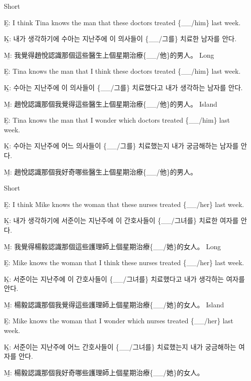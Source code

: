\pex %
\a Short\par\nobreak
\beginsubsub
\b{E:} I think Tina knows the man that these doctors treated \{\_\_/him\} last week.\par\nobreak
\b{K:} \ko 내가 생각하기에 수아는 지난주에 이 의사들이 \{\_\_/그를\} 치료한 남자를 안다. \normalfont\par\nobreak
\b{M:} \zh 我覺得趙悅認識那個這些醫生上個星期治療\{\_\_/他\}的男人。 \normalfont
\endsubsub
\a Long\par\nobreak
\beginsubsub
\b{E:} Tina knows the man that I think these doctors treated \{\_\_/him\} last week.\par\nobreak
\b{K:} \ko 수아는 지난주에 이 의사들이 \{\_\_/그를\} 치료했다고 내가 생각하는 남자를 안다. \normalfont\par\nobreak
\b{M:} \zh 趙悅認識那個我覺得這些醫生上個星期治療\{\_\_/他\}的男人。 \normalfont
\endsubsub
\a Island\par\nobreak
\beginsubsub
\b{E:} Tina knows the man that I wonder which doctors treated \{\_\_/him\} last week.\par\nobreak
\b{K:} \ko 수아는 지난주에 어느 의사들이 \{\_\_/그를\} 치료했는지 내가 궁금해하는 남자를 안다\normalfont.\par\nobreak
\b{M:} \zh 趙悅認識那個我好奇哪些醫生上個星期治療\{\_\_/他\}的男人。\normalfont
\endsubsub
\xe

\pex %
\a Short\par\nobreak
\beginsubsub
\b{E:} I think Mike knows the woman that these nurses treated \{\_\_/her\} last week.\par\nobreak
\b{K:} \ko 내가 생각하기에 서준이는 지난주에 이 간호사들이 \{\_\_/그녀를\} 치료한 여자를 안다. \normalfont\par\nobreak
\b{M:} \zh 我覺得楊毅認識那個這些護理師上個星期治療\{\_\_/她\}的女人。 \normalfont
\endsubsub
\a Long\par\nobreak
\beginsubsub
\b{E:} Mike knows the woman that I think these nurses treated \{\_\_/her\} last week.\par\nobreak
\b{K:} \ko 서준이는 지난주에 이 간호사들이 \{\_\_/그녀를\} 치료했다고 내가 생각하는 여자를 안다. \normalfont\par\nobreak
\b{M:} \zh 楊毅認識那個我覺得這些護理師上個星期治療\{\_\_/她\}的女人。 \normalfont
\endsubsub
\a Island\par\nobreak
\beginsubsub
\b{E:} Mike knows the woman that I wonder which nurses treated \{\_\_/her\} last week.\par\nobreak
\b{K:} \ko 서준이는 지난주에 어느 간호사들이 \{\_\_/그녀를\} 치료했는지 내가 궁금해하는 여자를 안다\normalfont.\par\nobreak
\b{M:} \zh 楊毅認識那個我好奇哪些護理師上個星期治療\{\_\_/她\}的女人。\normalfont
\endsubsub
\xe

